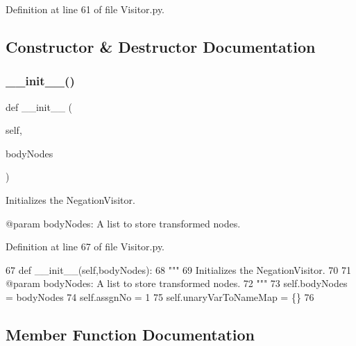 Definition at line 61 of file Visitor.\+py.



\subsection{Constructor \& Destructor Documentation}
\mbox{\label{classPostProcessor_1_1Visitor_1_1NegationVisitor_a2ed95e2a3a463515d5383413f46a06ad}} 
\subsubsection{\texorpdfstring{\+\_\+\+\_\+init\+\_\+\+\_\+()}{\_\_init\_\_()}}
{\footnotesize\ttfamily def \+\_\+\+\_\+init\+\_\+\+\_\+ (\begin{DoxyParamCaption}\item[{}]{self,  }\item[{}]{body\+Nodes }\end{DoxyParamCaption})}

\begin{DoxyVerb}Initializes the NegationVisitor.

@param bodyNodes: A list to store transformed nodes.
\end{DoxyVerb}
 

Definition at line 67 of file Visitor.\+py.


\begin{DoxyCode}
67     \textcolor{keyword}{def }\_\_init\_\_(self,bodyNodes):
68         \textcolor{stringliteral}{"""
}
69 \textcolor{stringliteral}{        Initializes the NegationVisitor.
}
70 \textcolor{stringliteral}{
}
71 \textcolor{stringliteral}{        @param bodyNodes: A list to store transformed nodes.
}
72 \textcolor{stringliteral}{        """}
73         self.bodyNodes = bodyNodes
74         self.assgnNo = 1
75         self.unaryVarToNameMap = \{\}
76 
\end{DoxyCode}


\subsection{Member Function Documentation}
\mbox{\label{classPostProcessor_1_1Visitor_1_1NegationVisitor_adae6ad6f5b94c4acd95924bb3df9ebc8}} 
